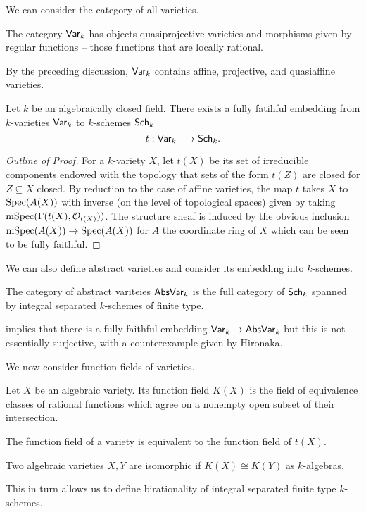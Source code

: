 We can consider the category of all varieties. 
\begin{definition}\label{def: varieties}
    The category $\mathsf{Var}_{k}$ has objects quasiprojective varieties and morphisms given by regular functions -- those functions that are locally rational. 
\end{definition}
By the preceding discussion, $\mathsf{Var}_{k}$ contains affine, projective, and quasiaffine varieties. 
\begin{theorem}\label{thm: fully faithful embedding}
    Let $k$ be an algebraically closed field. There exists a fully fatihful embedding from $k$-varieties $\mathsf{Var}_{k}$ to $k$-schemes $\mathsf{Sch}_{k}$
    $$t:\mathsf{Var}_{k}\longrightarrow\mathsf{Sch}_{k}.$$
\end{theorem}
\begin{proof}[Outline of Proof]
    For a $k$-variety $X$, let $t(X)$ be its set of irreducible components endowed with the topology that sets of the form $t(Z)$ are closed for $Z\subseteq X$ closed. By reduction to the case of affine varieties, the map $t$ takes $X$ to $\operatorname{Spec}(A(X))$ with inverse (on the level of topological spaces) given by taking $\mathrm{mSpec}(\Gamma(t(X),\mathcal{O}_{t(X)}))$. The structure sheaf is induced by the obvious inclusion $\mathrm{mSpec}(A(X))\to\operatorname{Spec}(A(X))$ for $A$ the coordinate ring of $X$ which can be seen to be fully faithful. 
\end{proof}
We can also define abstract varieties and consider its embedding into $k$-schemes. 
\begin{definition}\label{def: abstract varieties}
    The category of abstract variteies $\mathsf{AbsVar}_{k}$ is the full category of $\mathsf{Sch}_{k}$ spanned by integral separated $k$-schemes of finite type. 
\end{definition}
 implies that there is a fully faithful embedding $\mathsf{Var}_{k}\to\mathsf{AbsVar}_{k}$ but this is not essentially surjective, with a counterexample given by Hironaka. 

We now consider function fields of varieties. 
\begin{definition}\label{def: function field}
    Let $X$ be an algebraic variety. Its function field $K(X)$ is the field of equivalence classes of rational functions which agree on a nonempty open subset of their intersection. 
\end{definition}
The function field of a variety is equivalent to the function field of $t(X)$. 
\begin{definition}[Birational]\label{def: birational}
    Two algebraic varieties $X,Y$ are isomorphic if $K(X)\cong  K(Y)$ as $k$-algebras. 
\end{definition}
This in turn allows us to define birationality of integral separated finite type $k$-schemes. 
